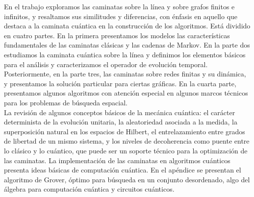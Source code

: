 En el trabajo exploramos las caminatas sobre la línea y sobre grafos finitos e infinitos, y resaltamos sus similitudes y diferencias, con énfasis en aquello que destaca a la caminata cuántica en la construcción de los algoritmos.
Está dividido en cuatro partes. En la primera presentamos los modelos las características fundamentales de las caminatas clásicas y las cadenas de Markov. En la parte dos estudiamos la caminata cuántica sobre la línea y definimos los elementos básicos para el análisis y caracterizamos el operador de evolución temporal.
Posteriormente, en la parte tres, las caminatas sobre redes finitas y su dinámica, y presentamos la solución particular para ciertas gráficas. En la cuarta parte, presentamos algunos algoritmos con atención especial en algunos marcos técnicos para los problemas de búsqueda espacial.\\

La revisión de algunos conceptos básicos de la mecánica cuántica: el carácter determinista de la evolución unitaria, la aleatoriedad asociada a la medida, la superposición natural en los espacios de Hilbert, el entrelazamiento entre grados de libertad de un mismo sistema, y los niveles de decoherencia como puente entre lo clásico y lo cuántico, que puede ser un soporte técnico para la optimización de las caminatas. La implementación de las caminatas en algoritmos cuánticos presenta ideas básicas de computación cuántica. En el apéndice se presentan el algoritmo de Grover, óptimo para búsqueda en un conjunto desordenado, algo del álgebra para computación cuántica y circuitos cuánticos.\\
